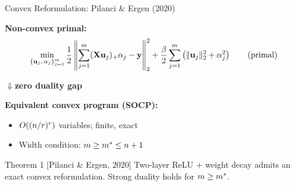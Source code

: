 \begin{frame}{Convex Reformulation: Pilanci \& Ergen (2020)}

  \textbf{Non-convex primal:}
  \vspace{-0.5em}
  \[
    \min_{\{\mathbf{u}_j,\,\alpha_j\}_{j=1}^{m}}
    \frac{1}{2} \left\|
      \sum_{j=1}^{m} (\mathbf{X} \mathbf{u}_j)_+ \alpha_j - \mathbf{y}
    \right\|_2^2
    + \frac{\beta}{2} \sum_{j=1}^{m}
      \left( \|\mathbf{u}_j\|_2^2 + \alpha_j^2 \right)
    \tag{primal}
  \]

  \vspace{-0.3em}
  \begin{center}
    \large$\Downarrow$\quad \textbf{zero duality gap}
  \end{center}
  \vspace{-0.5em}

  \textbf{Equivalent convex program (SOCP):}
  \begin{itemize}
    \item $O\!\left((n/r)^{r}\right)$ variables; finite, exact
    \item Width condition: $m \geq m^* \leq n+1$
  \end{itemize}

  \vspace{0.3em}
  \begin{alertblock}{Theorem 1 \normalfont\small[Pilanci \& Ergen, 2020]}
    Two-layer ReLU $+$ weight decay admits an exact convex reformulation.
    Strong duality holds for $m \geq m^*$.
  \end{alertblock}

\end{frame}


